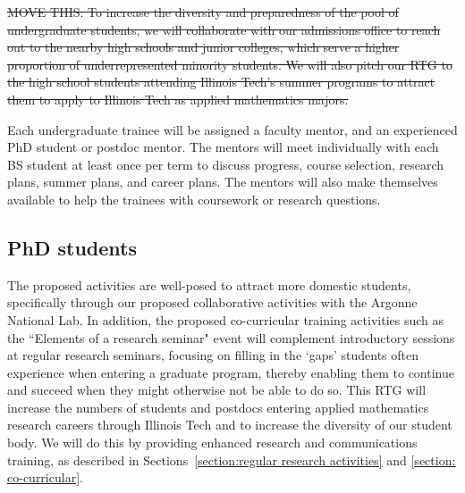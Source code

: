 \documentclass[11pt]{NSFamsart}
\begin{document}
{%
\sout{MOVE THIS: To increase the diversity and preparedness of the pool of undergraduate students, we will collaborate with our admissions office to reach out to the nearby high schools and junior colleges, which serve a higher proportion of underrepresented minority students.  We will also pitch our RTG to the high school students attending Illinois Tech's summer programs to attract them to apply to Illinois Tech as applied mathematics majors.} 

Each undergraduate trainee will be assigned a faculty mentor, and  an experienced PhD student or postdoc mentor. %
The mentors will meet individually with each BS student at least once per term to discuss progress, course selection, research plans, summer plans, and career plans.  The mentors will also make themselves available to help the trainees with coursework or research questions. %

\subsection*{PhD students} 

The proposed activities are well-posed to attract more domestic students, specifically through our proposed collaborative activities with the Argonne National Lab. 
In addition, the proposed co-curricular training activities such as the ``Elements of a research seminar" event will complement introductory sessions at regular research seminars, focusing on filling in the `gaps' students often experience when entering a graduate program, thereby enabling them to continue and succeed when they might otherwise not be able to do so. 
This RTG will increase the numbers of students and postdocs entering applied mathematics research careers through Illinois Tech and to increase the diversity of our student body.  We will do this by  %
 providing enhanced research and communications training, as described in Sections~\ref{section:regular research activities} and \ref{section: co-curricular}.


}
\end{document}
